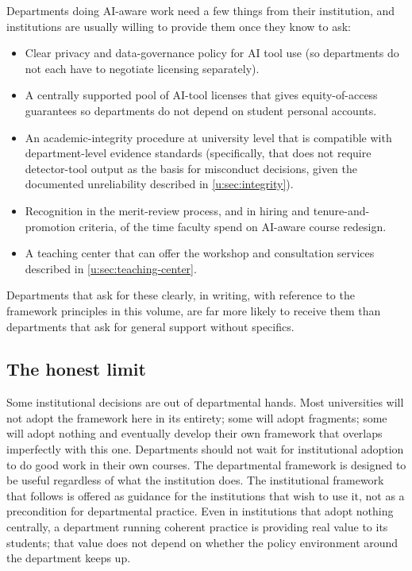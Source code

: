 \documentclass{SIAMbook2023}
\begin{document}
Departments doing AI-aware work need a few things from their institution, and institutions are usually willing to provide them once they know to ask:
\begin{itemize}
\item Clear privacy and data-governance policy for AI tool use (so departments do not each have to negotiate licensing separately).
\item A centrally supported pool of AI-tool licenses that gives equity-of-access guarantees so departments do not depend on student personal accounts.
\item An academic-integrity procedure at university level that is compatible with department-level evidence standards (specifically, that does not require detector-tool output as the basis for misconduct decisions, given the documented unreliability described in \cref{u:sec:integrity}).
\item Recognition in the merit-review process, and in hiring and tenure-and-promotion criteria, of the time faculty spend on AI-aware course redesign.
\item A teaching center that can offer the workshop and consultation services described in \cref{u:sec:teaching-center}.
\end{itemize}
Departments that ask for these clearly, in writing, with reference to the framework principles in this volume, are far more likely to receive them than departments that ask for general support without specifics.

\subsection{The honest limit}
\label{u:subsec:honest-limit}

Some institutional decisions are out of departmental hands. Most universities will not adopt the framework here in its entirety; some will adopt fragments; some will adopt nothing and eventually develop their own framework that overlaps imperfectly with this one. Departments should not wait for institutional adoption to do good work in their own courses. The departmental framework is designed to be useful regardless of what the institution does. The institutional framework that follows is offered as guidance for the institutions that wish to use it, not as a precondition for departmental practice. Even in institutions that adopt nothing centrally, a department running coherent practice is providing real value to its students; that value does not depend on whether the policy environment around the department keeps up.
\end{document}

